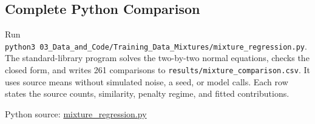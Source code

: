 \hypertarget{M07-complete-python-comparison-1}{%
\subsection{Complete Python
Comparison}\label{M07-complete-python-comparison-1}}

\noindent \noindent Run
\texttt{python3\ 03\_Data\_and\_Code/Training\_Data\_Mixtures/mixture\_regression.py}.
The standard-library program solves the two-by-two normal equations,
checks the closed form, and writes 261 comparisons to
\texttt{results/mixture\_comparison.csv}. It uses source means without
simulated noise, a seed, or model calls. Each row states the source
counts, similarity, penalty regime, and fitted contributions.

\FloatBarrier
{}
Python source:
\href{../03_Data_and_Code/Training_Data_Mixtures/mixture_regression.py}{mixture\_regression.py}

